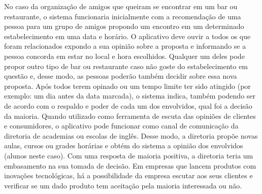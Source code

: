     No caso da organização de amigos que queiram se encontrar em um bar ou restaurante, o sistema funcionaria inicialmente com a recomendação de uma pessoa para um grupo de amigos propondo um encontro em um determinado estabelecimento em uma data e horário. O aplicativo deve ouvir a todos os que foram relacionados expondo a sua opinião sobre a proposta e informando se a pessoa concorda em estar no local e hora escolhidos. Qualquer um deles pode propor outro tipo de bar ou restaurante caso não goste do estabelecimento em questão e, desse modo, as pessoas poderão também decidir sobre essa nova proposta. Após todos terem opinado ou um tempo limite ter sido atingido (por exemplo: um dia antes da data marcada), o sistema indica, também podendo ser de acordo com o respaldo e poder de cada um dos envolvidos, qual foi a decisão da maioria. Quando utilizado como ferramenta de escuta das opiniões de clientes e consumidores, o aplicativo pode funcionar como canal de comunicação da diretoria de academias ou escolas de inglês. Desse modo, a diretoria propõe novas aulas, cursos ou grades horárias e obtém do sistema a opinião dos envolvidos (alunos neste caso). Com uma resposta de maioria positiva, a diretoria teria um embasamento na sua tomada de decisão. Em empresas que lancem produtos com inovações tecnológicas, há a possibilidade da empresa escutar aos seus clientes e verificar se um dado produto tem aceitação pela maioria interessada ou não.
